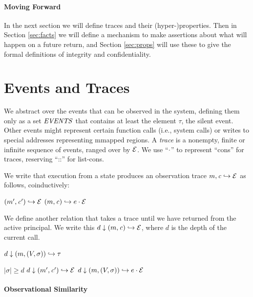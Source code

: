 \documentclass[10pt,conference]{ieeetran}%
\theoremstyle{definition}
\begin{document}
\paragraph*{Moving Forward}

In the next section we will define traces and their (hyper-)properties.
Then in Section \ref{sec:facts} we will define a mechanism to make assertions
about what will happen on a future return, and Section \ref{sec:props} will use these
to give the formal definitions of integrity and confidentiality.

\section{Events and Traces}
\label{sec:events}

We abstract over the events that can be observed in the system, defining them
only as a set \(\mathit{EVENTS}\) that contains at least the element \(\tau\), the silent
event. Other events might represent certain function calls (i.e., system calls)
or writes to special addresses representing mmapped regions.
A {\em trace} is a nonempty, finite or infinite sequence
of events, ranged over by \(\mathcal{E}\).
We use ``\(\cdot\)'' to represent ``cons'' for traces, reserving ``::''
for list-cons.

We write that execution from a state produces an observation trace
\(m,\mathit{c} \hookrightarrow \mathcal{E}\) as follows, coinductively:

            {\((m',\mathit{c}') \hookrightarrow \mathcal{E}\)}
            {\((m,\mathit{c}) \hookrightarrow e \cdot \mathcal{E}\)}

We define another relation that takes a trace until we have returned from the
active principal.
We write this \(d \downarrow (m,\mathit{c}) \hookrightarrow \mathcal{E}\), where
\(d\) is the depth of the current call.

         {\(d \downarrow (m,(V,\sigma)) \hookrightarrow \tau\)}

                  {\(|\sigma| \geq d\)}
                  {\(d \downarrow (m',\mathit{c}') \hookrightarrow \mathcal{E}\)}
                  {\(d \downarrow (m,(V,\sigma)) \hookrightarrow e \cdot \mathcal{E}\)}

\paragraph*{Observational Similarity}
\end{document}
